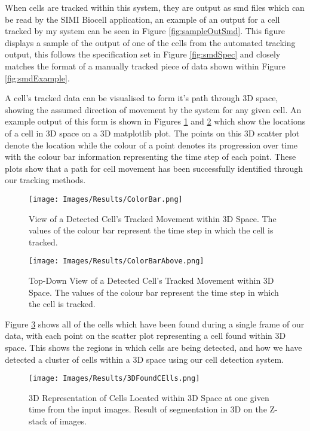 \documentclass[12pt a4paper]{article}
\begin{document}
When cells are tracked within this system, they are output as smd files which can be read by the SIMI Biocell application, an example of an output for a cell tracked by my system can be seen in Figure \ref{fig:sampleOutSmd}. This figure displays a sample of the output of one of the cells from the automated tracking output, this follows the specification set in Figure \ref{fig:smdSpec} and closely matches the format of a manually tracked piece of data shown within Figure \ref{fig:smdExample}.

A cell's tracked data can be visualised to form it's path through 3D space, showing the assumed direction of movement by the system for any given cell. An example output of this form is shown in Figures \ref{fig:3DtrackedOutput} and \ref{fig:3DtrackedOutputDown} which show the locations of a cell in 3D space on a 3D matplotlib plot. The points on this 3D scatter plot denote the location while the colour of a point denotes its progression over time with the colour bar information representing the time step of each point. These plots show that a path for cell movement has been successfully identified through our tracking methods.
\begin{figure}
    \centering
    \texttt{[image: Images/Results/ColorBar.png]}
    \caption{View of a Detected Cell's Tracked Movement within 3D Space. The values of the colour bar represent the time step in which the cell is tracked.}
    \label{fig:3DtrackedOutput}
\end{figure}
\begin{figure}
    \centering
    \texttt{[image: Images/Results/ColorBarAbove.png]}
    \caption{Top-Down View of a Detected Cell's Tracked Movement within 3D Space. The values of the colour bar represent the time step in which the cell is tracked.}
    \label{fig:3DtrackedOutputDown}
\end{figure}

Figure \ref{fig:3DCells} shows all of the cells which have been found during a single frame of our data, with each point on the scatter plot representing a cell found within 3D space. This shows the regions in which cells are being detected, and how we have detected a cluster of cells within a 3D space using our cell detection system.

\begin{figure}
    \centering
    \texttt{[image: Images/Results/3DFoundCElls.png]}
    \caption{3D Representation of Cells Located within 3D Space at one given time from the input images. Result of segmentation in 3D on the Z-stack of images.}
    \label{fig:3DCells}
\end{figure}
\end{document}
